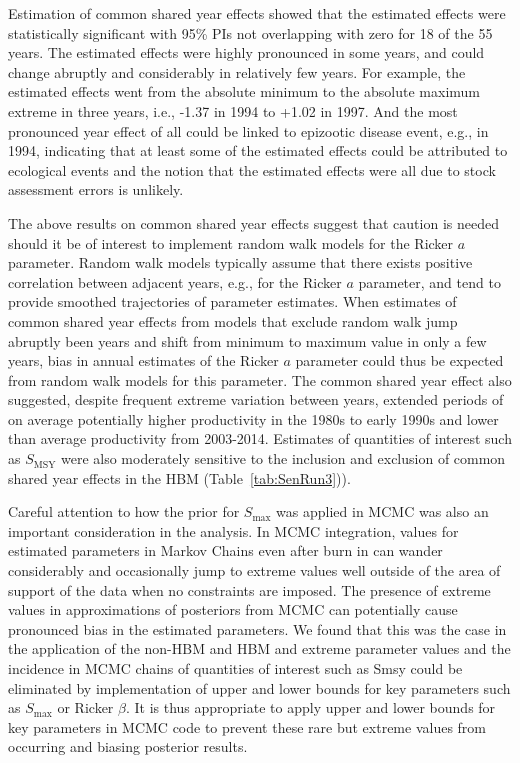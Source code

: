 \documentclass[french,11pt]{book}
\begin{document}
Estimation of common shared year effects showed that the estimated effects were statistically significant with 95\% PIs not overlapping with zero for 18 of the 55 years. The estimated effects were highly pronounced in some years, and could change abruptly and considerably in relatively few years. For example, the estimated effects went from the absolute minimum to the absolute maximum extreme in three years, i.e., -1.37 in 1994 to +1.02 in 1997. And the most pronounced year effect of all could be linked to epizootic disease event, e.g., in 1994, indicating that at least some of the estimated effects could be attributed to ecological events and the notion that the estimated effects were all due to stock assessment errors is unlikely.

The above results on common shared year effects suggest that caution is needed should it be of interest to implement random walk models for the Ricker \(a\) parameter. Random walk models typically assume that there exists positive correlation between adjacent years, e.g., for the Ricker \(a\) parameter, and tend to provide smoothed trajectories of parameter estimates. When estimates of common shared year effects from models that exclude random walk jump abruptly been years and shift from minimum to maximum value in only a few years, bias in annual estimates of the Ricker \(a\) parameter could thus be expected from random walk models for this parameter. The common shared year effect also suggested, despite frequent extreme variation between years, extended periods of on average potentially higher productivity in the 1980s to early 1990s and lower than average productivity from 2003-2014. Estimates of quantities of interest such as $S_\textrm{MSY}$ were also moderately sensitive to the inclusion and exclusion of common shared year effects in the HBM (Table~\ref{tab:SenRun3})).

Careful attention to how the prior for $S_\textrm{max}$ was applied in MCMC was also an important consideration in the analysis. In MCMC integration, values for estimated parameters in Markov Chains even after burn in can wander considerably and occasionally jump to extreme values well outside of the area of support of the data when no constraints are imposed. The presence of extreme values in approximations of posteriors from MCMC can potentially cause pronounced bias in the estimated parameters. We found that this was the case in the application of the non-HBM and HBM and extreme parameter values and the incidence in MCMC chains of quantities of interest such as Smsy could be eliminated by implementation of upper and lower bounds for key parameters such as $S_\textrm{max}$ or Ricker \(\beta\). It is thus appropriate to apply upper and lower bounds for key parameters in MCMC code to prevent these rare but extreme values from occurring and biasing posterior results.
\end{document}

